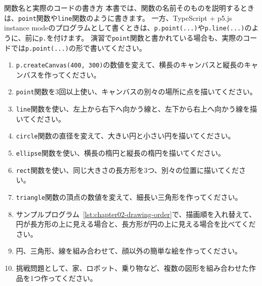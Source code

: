 \begin{pointbox}{関数名と実際のコードの書き方}
本書では、関数の名前そのものを説明するときは、\texttt{point}関数や\texttt{line}関数のように書きます。
一方、TypeScript + p5.js instance modeのプログラムとして書くときは、\texttt{p.point(...)}や\texttt{p.line(...)}のように、前に\texttt{p.}を付けます。
演習で\texttt{point}関数と書かれている場合も、実際のコードでは\texttt{p.point(...)}の形で書いてください。
\end{pointbox}

\begin{enumerate}
    \item \texttt{p.createCanvas(400, 300)}の数値を変えて、横長のキャンバスと縦長のキャンバスを作ってください。
    \item \texttt{point}関数を3回以上使い、キャンバスの別々の場所に点を描いてください。
    \item \texttt{line}関数を使い、左上から右下へ向かう線と、左下から右上へ向かう線を描いてください。
    \item \texttt{circle}関数の直径を変えて、大きい円と小さい円を描いてください。
    \item \texttt{ellipse}関数を使い、横長の楕円と縦長の楕円を描いてください。
    \item \texttt{rect}関数を使い、同じ大きさの長方形を3つ、別々の位置に描いてください。
    \item \texttt{triangle}関数の頂点の数値を変えて、細長い三角形を作ってください。
    \item サンプルプログラム~\ref{lst:chapter02-drawing-order}で、描画順を入れ替えて、円が長方形の上に見える場合と、長方形が円の上に見える場合を比べてください。
    \item 円、三角形、線を組み合わせて、顔以外の簡単な絵を作ってください。
    \item 挑戦問題として、家、ロボット、乗り物など、複数の図形を組み合わせた作品を1つ作ってください。
\end{enumerate}
